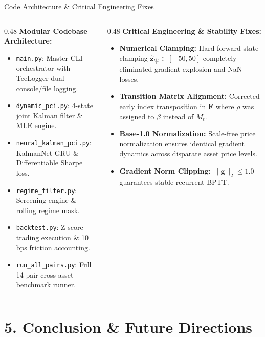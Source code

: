\documentclass[10pt, aspectratio=169]{beamer}
\begin{document}
\begin{frame}{Code Architecture \& Critical Engineering Fixes}
  \small
  \begin{columns}[T]
    \begin{column}{0.48\textwidth}
      \textbf{Modular Codebase Architecture:}
      \begin{itemize}
        \item \texttt{main.py}: Master CLI orchestrator with TeeLogger dual console/file logging.
        \item \texttt{dynamic\_pci.py}: 4-state joint Kalman filter \& MLE engine.
        \item \texttt{neural\_kalman\_pci.py}: KalmanNet GRU \& Differentiable Sharpe loss.
        \item \texttt{regime\_filter.py}: Screening engine \& rolling regime mask.
        \item \texttt{backtest.py}: Z-score trading execution \& 10 bps friction accounting.
        \item \texttt{run\_all\_pairs.py}: Full 14-pair cross-asset benchmark runner.
      \end{itemize}
    \end{column}
    \begin{column}{0.48\textwidth}
      \textbf{Critical Engineering & Stability Fixes:}
      \begin{itemize}
        \item \textbf{Numerical Clamping:} Hard forward-state clamping $\hat{\bm{z}}_{t|t} \in [-50, 50]$ completely eliminated gradient explosion and NaN losses.
        \item \textbf{Transition Matrix Alignment:} Corrected early index transposition in $\bm{F}$ where $\rho$ was assigned to $\beta$ instead of $M_t$.
        \item \textbf{Base-1.0 Normalization:} Scale-free price normalization ensures identical gradient dynamics across disparate asset price levels.
        \item \textbf{Gradient Norm Clipping:} $\|\bm{g}\|_2 \le 1.0$ guarantees stable recurrent BPTT.
      \end{itemize}
    \end{column}
  \end{columns}
\end{frame}

\section{5. Conclusion \& Future Directions}
\end{document}
